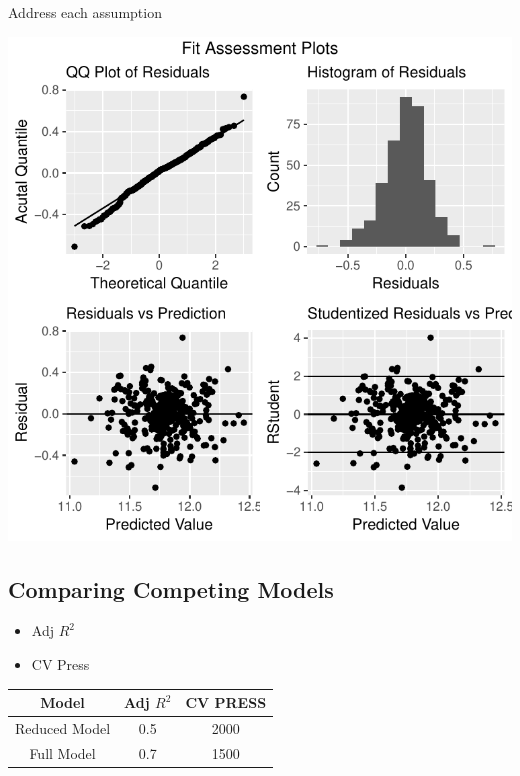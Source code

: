 \documentclass[american,]{article}
\providecommand{\tightlist}{%
  \setlength{\itemsep}{0pt}\setlength{\parskip}{0pt}}
\begin{document}
Address each assumption

\begin{center}\includegraphics{HousePriceRegressionAnalysis_files/figure-latex/diag-plots-1} \end{center}

\hypertarget{comparing-competing-models}{%
\subsection{Comparing Competing
Models}\label{comparing-competing-models}}

\begin{itemize}
\tightlist
\item
  Adj \(R^2\)
\item
  CV Press
\end{itemize}

\begin{table}[h]
\centering
\begin{tabular}{|c|c|c|}
\hline
Model         & Adj $R^2$ & CV PRESS \\ \hline
Reduced Model & 0.5       & 2000     \\ \hline
Full Model    & 0.7       & 1500     \\ \hline
\end{tabular}
\end{table}
\end{document}
